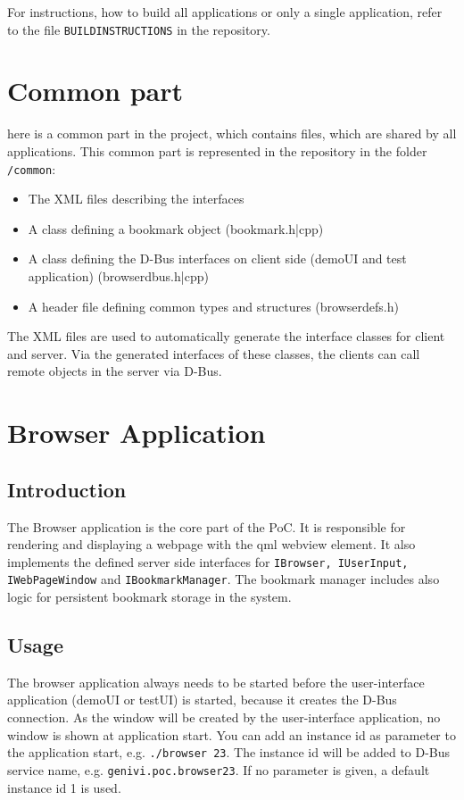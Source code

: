 \documentclass{pelagicore}
\begin{document}
For instructions, how to build all applications or only a single application,
refer to the file {\tt BUILDINSTRUCTIONS} in the repository.

\section {Common part}
here is a common part in the project, which contains files, which are shared by
all applications. This common part is represented in the repository in the
folder {\tt /common}:

\begin{itemize}
    \item The XML files describing the interfaces
    \item A class defining a bookmark object (bookmark.h|cpp)
    \item A class defining the D-Bus interfaces on client side (demoUI and test
          application) (browserdbus.h|cpp)
    \item A header file defining common types and structures (browserdefs.h)
\end{itemize}

The XML files are used to automatically generate the interface classes for
client and server. Via the generated interfaces of these classes, the clients
can call remote objects in the server via D-Bus.

\section{Browser Application}
\subsection{Introduction}
The Browser application is the core part of the PoC. It is responsible for
rendering and displaying a webpage with the qml webview element. It also
implements the defined server side interfaces for {\tt IBrowser, IUserInput,
IWebPageWindow} and {\tt IBookmarkManager}. The bookmark manager includes also
logic for persistent bookmark storage in the system.

\subsection{Usage}
The browser application always needs to be started before the user-interface
application (demoUI or testUI) is started, because it creates the D-Bus
connection. As the window will be created by the user-interface application, no
window is shown at application start.  You can add an instance id as parameter
to the application start, e.g. {\tt ./browser 23}. The instance id will be
added to D-Bus service name, e.g. {\tt genivi.poc.browser23}. If no parameter
is given, a default instance id 1 is used.
\end{document}

